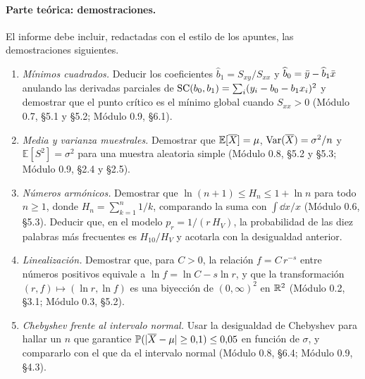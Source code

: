 \paragraph{Parte teórica: demostraciones.} El informe debe incluir, redactadas con el estilo de los apuntes, las demostraciones siguientes.
\begin{enumerate}[label=D\arabic*.]
  \item \emph{Mínimos cuadrados.} Deducir los coeficientes $\widehat b_1=S_{xy}/S_{xx}$ y $\widehat b_0=\bar{y}-\widehat b_1\bar{x}$ anulando las derivadas parciales de $\operatorname{SC}(b_0,b_1)=\sum_i(y_i-b_0-b_1x_i)^{2}$ y demostrar que el punto crítico es el mínimo global cuando $S_{xx}>0$ (Módulo 0.7, §5.1 y §5.2; Módulo 0.9, §6.1).
  \item \emph{Media y varianza muestrales.} Demostrar que $\mathbb E[\overline{X}]=\mu$, $\operatorname{Var}(\overline{X})=\sigma^{2}/n$ y $\mathbb E[S^{2}]=\sigma^{2}$ para una muestra aleatoria simple (Módulo 0.8, §5.2 y §5.3; Módulo 0.9, §2.4 y §2.5).
  \item \emph{Números armónicos.} Demostrar que $\ln(n+1)\le H_n\le1+\ln n$ para todo $n\ge1$, donde $H_n=\sum_{k=1}^{n}1/k$, comparando la suma con $\int\dd x/x$ (Módulo 0.6, §5.3). Deducir que, en el modelo $p_r=1/(r\,H_V)$, la probabilidad de las diez palabras más frecuentes es $H_{10}/H_V$ y acotarla con la desigualdad anterior.
  \item \emph{Linealización.} Demostrar que, para $C>0$, la relación $f=C\,r^{-s}$ entre números positivos equivale a $\ln f=\ln C-s\ln r$, y que la transformación $(r,f)\mapsto(\ln r,\ln f)$ es una biyección de $(0,\infty)^{2}$ en $\mathbb{R}^{2}$ (Módulo 0.2, §3.1; Módulo 0.3, §5.2).
  \item \emph{Chebyshev frente al intervalo normal.} Usar la desigualdad de Chebyshev para hallar un $n$ que garantice $\mathbb{P}(\lvert\overline{X}-\mu\rvert\ge0{,}1)\le0{,}05$ en función de $\sigma$, y compararlo con el que da el intervalo normal (Módulo 0.8, §6.4; Módulo 0.9, §4.3).
\end{enumerate}

